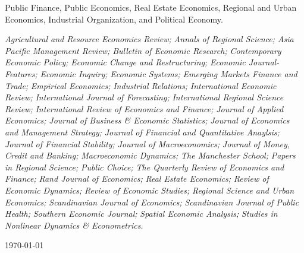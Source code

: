 \documentclass{xetexCV}
\begin{document}
Public Finance, Public Economics, Real Estate Economics, Regional and Urban Economics, Industrial Organization,  and Political Economy.


\nocite{*}



\begin{flushleft}
\emph{Agricultural and Resource Economics Review;}
\emph{Annals of Regional Science;}
\emph{Asia Pacific Management Review;}
\emph{Bulletin of Economic Research;}
\emph{Contemporary Economic Policy;} 
\emph{Economic Change and Restructuring;}
\emph{Economic Journal-Features;} 
\emph{Economic Inquiry;}
\emph{Economic Systems;}
\emph{Emerging Markets Finance and Trade;}
\emph{Empirical Economics;}
\emph{Industrial Relations;} 
\emph{International Economic Review;} 
\emph{International Journal of Forecasting;}
\emph{International Regional Science Review;}
\emph{International Review of Economics and Finance;}
\emph{Journal of Applied Economics;}
\emph{Journal of Business \& Economic Statistics;}
\emph{Journal of Economics and Management Strategy;} 
\emph{Journal of Financial and Quantitative Anaylsis;}
\emph{Journal of Financial Stability;}
\emph{Journal of Macroeconomics;}
\emph{Journal of Money, Credit and Banking;} 
\emph{Macroeconomic Dynamics;}
\emph{The Manchester School;} 
\emph{Papers in Regional Science;} 
\emph{Public Choice;}
\emph{The Quarterly Review of Economics and Finance;}
\emph{Rand Journal of Economics;} 
\emph{Real Estate Economics;}
\emph{Review of Economic Dynamics;} 
\emph{Review of Economic Studies;} 
\emph{Regional Science and Urban Economics;} 
\emph{Scandinavian Journal of Economics;}
\emph{Scandinavian Journal of Public Health;} 
\emph{Southern Economic Journal;}
\emph{Spatial Economic Analysis;}
\emph{Studies in Nonlinear Dynamics \& Econometrics.}
\end{flushleft}
\begin{flushleft}
\today
\end{flushleft}
\end{document}
